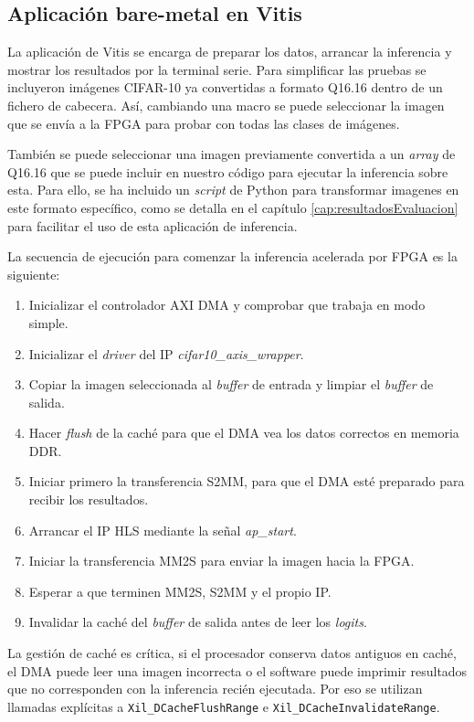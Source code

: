 \subsection{Aplicación bare-metal en Vitis}
La aplicación de Vitis se encarga de preparar los datos, arrancar la inferencia y mostrar los
resultados por la terminal serie. Para simplificar las pruebas se incluyeron imágenes \ac{CIFAR}-10
ya convertidas a formato Q16.16 dentro de un fichero de cabecera.
Así, cambiando una macro se puede seleccionar la imagen que se envía a la \ac{FPGA} para probar con
todas las clases de imágenes.

También se puede seleccionar una imagen previamente convertida a un \textit{array} de Q16.16 que se
puede incluir en nuestro código para ejecutar la inferencia sobre esta.
Para ello, se ha incluido un \textit{script} de Python para transformar imagenes en este formato
específico, como se detalla en el capítulo \ref{cap:resultadosEvaluacion} para facilitar
el uso de esta aplicación de inferencia.

La secuencia de ejecución para comenzar la inferencia acelerada por \ac{FPGA} es la siguiente:

\begin{enumerate}
  \item Inicializar el controlador \ac{AXI} \ac{DMA} y comprobar que trabaja en modo simple.
  \item Inicializar el \textit{driver} del \ac{IP} \textit{cifar10\_axis\_wrapper}.
  \item Copiar la imagen seleccionada al \textit{buffer} de entrada y limpiar el
    \textit{buffer} de salida.
  \item Hacer \textit{flush} de la caché para que el \ac{DMA} vea los datos correctos en
    memoria \ac{DDR}.
  \item Iniciar primero la transferencia \ac{S2MM}, para que el \ac{DMA} esté preparado para
    recibir los resultados.
  \item Arrancar el \ac{IP} \ac{HLS} mediante la señal \textit{ap\_start}.
  \item Iniciar la transferencia \ac{MM2S} para enviar la imagen hacia la \ac{FPGA}.
  \item Esperar a que terminen \ac{MM2S}, \ac{S2MM} y el propio \ac{IP}.
  \item Invalidar la caché del \textit{buffer} de salida antes de leer los \textit{logits}.
\end{enumerate}

La gestión de caché es crítica, si el procesador conserva datos antiguos en caché, el \ac{DMA} puede
leer una imagen incorrecta o el software puede imprimir resultados que no corresponden
con la inferencia recién ejecutada.
Por eso se utilizan llamadas explícitas a
\texttt{Xil\_DCacheFlushRange} e \texttt{Xil\_DCacheInvalidateRange}.

